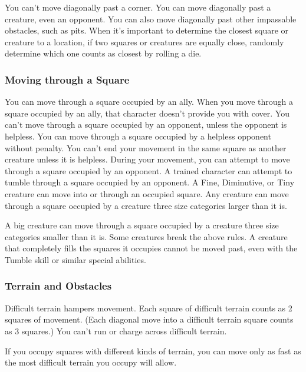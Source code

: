 You can't move diagonally past a corner. You can move diagonally past a creature, even an opponent. You can also move diagonally past other impassable obstacles, such as pits.
 When it's important to determine the closest square or creature to a location, if two squares or creatures are equally close, randomly determine which one counts as closest by rolling a die.

\subsubsection{Moving through a Square}
 You can move through a square occupied by an ally. When you move through a square occupied by an ally, that character doesn't provide you with cover.
 You can't move through a square occupied by an opponent, unless the opponent is helpless. You can move through a square occupied by a helpless opponent without penalty.
 You can't end your movement in the same square as another creature unless it is helpless.
 During your movement, you can attempt to move through a square occupied by an opponent.
 A trained character can attempt to tumble through a square occupied by an opponent.
 A Fine, Diminutive, or Tiny creature can move into or through an occupied square.
 Any creature can move through a square occupied by a creature  three size categories larger than it is.

A big creature can move through a square occupied by a creature three size categories smaller than it is.
 Some creatures break the above rules. A creature that completely fills the squares it
occupies cannot be moved past, even with the Tumble skill or similar special abilities.

\subsubsection{Terrain and Obstacles}
 Difficult terrain hampers movement. Each square of difficult terrain counts as 2 squares of movement. (Each diagonal move into a difficult terrain square counts as 3 squares.) You can't run or charge across difficult terrain.

If you occupy squares with different kinds of terrain, you can move only as fast as the most difficult terrain you occupy will allow.

